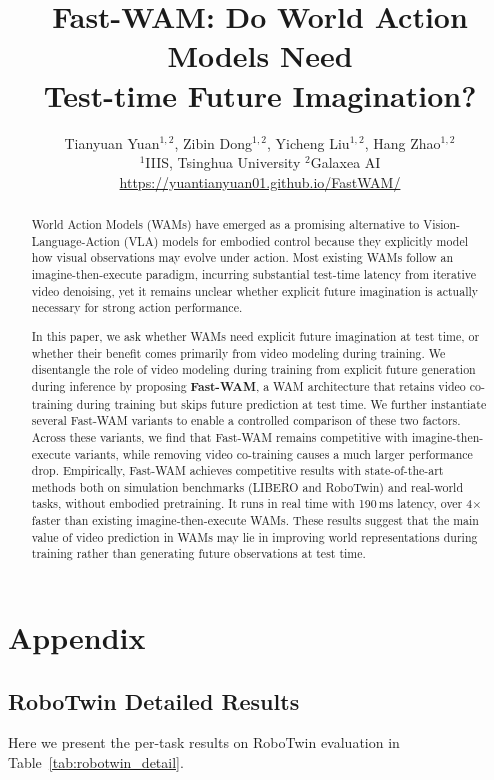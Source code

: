\documentclass{article}
\title{Fast-WAM: Do World Action Models Need \\Test-time Future Imagination?}
\author{%
    Tianyuan Yuan$^{1,2}$,
    Zibin Dong$^{1,2}$,
    Yicheng Liu$^{1,2}$,
    Hang Zhao$^{1,2}$
    \\[1ex]
    $^{1}$IIIS, Tsinghua University \hspace{1em}$^{2}$Galaxea AI\\
  \url{https://yuantianyuan01.github.io/FastWAM/} \\
}
\begin{document}
\maketitle
\begin{abstract}
World Action Models (WAMs) have emerged as a promising alternative to Vision-Language-Action (VLA) models for embodied control because they explicitly model how visual observations may evolve under action. Most existing WAMs follow an imagine-then-execute paradigm, incurring substantial test-time latency from iterative video denoising, yet it remains unclear whether explicit future imagination is actually necessary for strong action performance.

In this paper, we ask whether WAMs need explicit future imagination at test time, or whether their benefit comes primarily from video modeling during training. We disentangle the role of video modeling during training from explicit future generation during inference by proposing \textbf{Fast-WAM}, a WAM architecture that retains video co-training during training but skips future prediction at test time. 
We further instantiate several Fast-WAM variants to enable a controlled comparison of these two factors. Across these variants, we find that Fast-WAM remains competitive with imagine-then-execute variants, while removing video co-training causes a much larger performance drop. Empirically, Fast-WAM achieves competitive results with state-of-the-art methods both on simulation benchmarks (LIBERO and RoboTwin) and real-world tasks, without embodied pretraining. It runs in real time with 190\,ms latency, over 4$\times$ faster than existing imagine-then-execute WAMs. These results suggest that the main value of video prediction in WAMs may lie in improving world representations during training rather than generating future observations at test time.
\end{abstract}








\newpage




\appendix
\section{Appendix}


\subsection{RoboTwin Detailed Results}
Here we present the per-task results on RoboTwin evaluation in Table~\ref{tab:robotwin_detail}.

\end{document}
